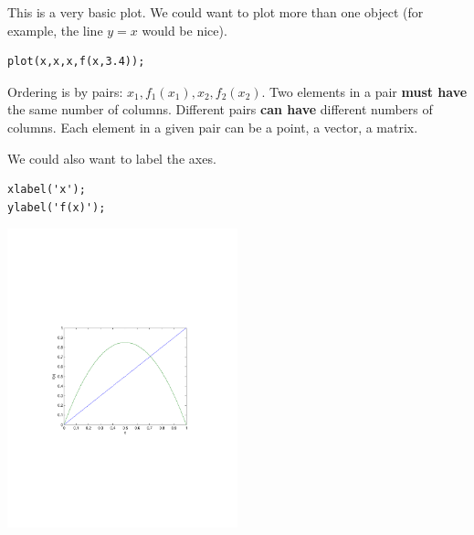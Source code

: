 

This is a very basic plot. 
We could want to plot more than one object (for example, the line $y=x$ would be nice).
\begin{verbatim}
plot(x,x,x,f(x,3.4));
\end{verbatim}
Ordering is by pairs: $x_1,f_1(x_1),x_2,f_2(x_2)$. Two elements in a pair {\bf must have} the same number of columns. Different pairs {\bf can have} different numbers of columns. Each element in a given pair can be a point, a vector, a matrix.

We could also want to label the axes.
\begin{verbatim}
xlabel('x');
ylabel('f(x)');
\end{verbatim}
\begin{center}
\includegraphics[width=0.5\textwidth]{../figs_01_intro_and_matlab/plot_iterates_2}
\end{center}

